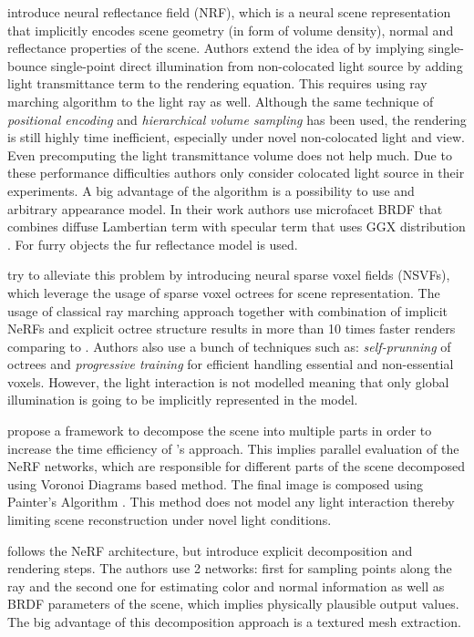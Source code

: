 \documentclass[english]{article}
\begin{document}
\cite{nrf2020} introduce neural reflectance field (NRF), which is a neural scene representation that implicitly encodes scene geometry (in form of volume density), normal and reflectance properties of the scene. Authors extend the idea of \cite{nerf2020mildenhall} by implying single-bounce single-point direct illumination from non-colocated light source by adding light transmittance term to the rendering equation. This requires using ray marching algorithm to the light ray as well. Although the same technique of \textit{positional encoding} and \textit{hierarchical volume sampling} has been used, the rendering is still highly time inefficient, especially under novel non-colocated light and view. Even precomputing the light transmittance volume does not help much. Due to these performance difficulties authors only consider colocated light source in their experiments. A big advantage of the algorithm is a possibility to use and arbitrary appearance model. In their work authors use microfacet BRDF that combines diffuse Lambertian term with specular term that uses GGX distribution \cite{walter2007microfacet}. For furry objects the fur reflectance model \cite{kajiya1989fur} is used.

\cite{nsvf2020} try to alleviate this problem by introducing neural sparse voxel fields (NSVFs), which leverage the usage of sparse voxel octrees for scene representation. The usage of classical ray marching approach together with combination of implicit NeRFs and explicit octree structure results in more than 10 times faster renders comparing to \cite{nerf2020mildenhall}. Authors also use a bunch of techniques such as: \textit{self-prunning} of octrees and \textit{progressive training} for efficient handling essential and non-essential voxels. However, the light interaction is not modelled meaning that only global illumination is going to be implicitly represented in the model.

\cite{rebain2020derf} propose a framework to decompose the scene into multiple parts in order to increase the time efficiency of \cite{nerf2020mildenhall}'s approach. This implies parallel evaluation of the NeRF networks, which are responsible for different parts of the scene decomposed using Voronoi Diagrams \cite{aurenhammer1991voronoi} based method. The final image is composed using Painter's Algorithm \cite{Newell1972ANA}. This method does not model any light interaction thereby limiting scene reconstruction under novel light conditions.

\cite{boss2020nerd} follows the NeRF architecture, but introduce explicit decomposition and rendering steps. The authors use 2 networks: first for sampling points along the ray and the second one for estimating color and normal information as well as BRDF parameters of the scene, which implies physically plausible output values. The big advantage of this decomposition approach is a textured mesh extraction.
\end{document}
